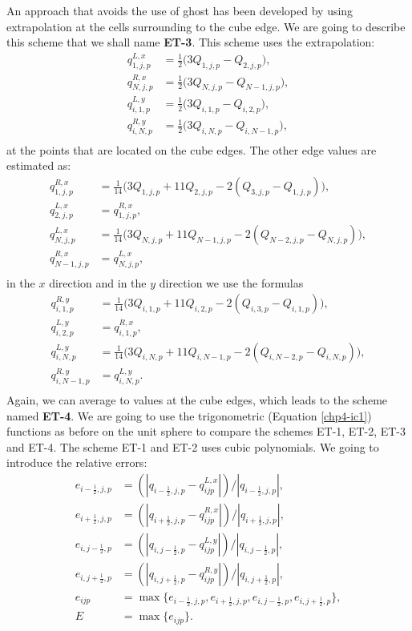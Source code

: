 An approach that avoids the use of ghost has been developed by \citet{putman:2007} using 
extrapolation at the cells surrounding to the cube edge.
We are going to describe this scheme that we shall name \textbf{ET-3}. This scheme uses the extrapolation:
\begin{align*}
	q^{L,x}_{1,j,p} &= \frac{1}{2}\bigg(3Q_{1,j,p} - Q_{2,j,p}\bigg),\\
	q^{R,x}_{N,j,p} &= \frac{1}{2}\bigg(3Q_{N,j,p} - Q_{N-1,j,p}\bigg),\\
	q^{L,y}_{i,1,p} &= \frac{1}{2}\bigg(3Q_{i,1,p} - Q_{i,2,p}\bigg),\\
	q^{R,y}_{i,N,p} &= \frac{1}{2}\bigg(3Q_{i,N,p} - Q_{i,N-1,p}\bigg),\\
\end{align*}
at the points that are located on the cube edges. The other edge values are estimated as:
\begin{align*}
	q^{R,x}_{1,j,p} &= \frac{1}{14}\bigg(3Q_{1,j,p} + 11Q_{2,j,p} - 2(Q_{3,j,p} - Q_{1,j,p})\bigg),\\
	q^{L,x}_{2,j,p} &= q^{R,x}_{1,j,p},\\
	q^{L,x}_{N,j,p} &= \frac{1}{14}\bigg(3Q_{N,j,p} + 11Q_{N-1,j,p} - 2(Q_{N-2,j,p} - Q_{N,j,p})\bigg),\\
	q^{R,x}_{N-1,j,p} &= q^{L,x}_{N,j,p},\\
\end{align*}
in the $x$ direction and in the $y$ direction we use the formulas
\begin{align*}
	q^{R,y}_{i,1,p} &= \frac{1}{14}\bigg(3Q_{i,1,p} + 11Q_{i,2,p} - 2(Q_{i,3,p} - Q_{i,1,p})\bigg),\\
	q^{L,y}_{i,2,p} &= q^{R,x}_{i,1,p},\\
	q^{L,y}_{i,N,p} &= \frac{1}{14}\bigg(3Q_{i,N,p} + 11Q_{i,N-1,p} - 2(Q_{i,N-2,p} - Q_{i,N,p})\bigg),\\
	q^{R,y}_{i,N-1,p} &= q^{L,y}_{i,N,p}.\\
\end{align*}
Again, we can average to values at the cube edges, which leads to the scheme named \textbf{ET-4}.
We are going to use the trigonometric (Equation \eqref{chp4-ic1}) functions
as before on the unit sphere to compare the schemes ET-1, ET-2, ET-3 and ET-4. The scheme ET-1 and ET-2
uses cubic polynomials.
We going to introduce the relative errors:
\begin{align*}
	e_{{i-\frac{1}{2}},j,p} &= (|q_{{i-\frac{1}{2}},j,p} - q^{L,x}_{ijp}|)/|q_{{i-\frac{1}{2}},j,p}|,\\
	e_{{i+\frac{1}{2}},j,p} &= (|q_{{i+\frac{1}{2}},j,p} - q^{R,x}_{ijp}|)/|q_{{i+\frac{1}{2}},j,p}|,\\
	e_{i,{j-\frac{1}{2}},p} &= (|q_{i,{j-\frac{1}{2}},p} - q^{L,y}_{ijp}|)/|q_{i,{j-\frac{1}{2}},p}|,\\
	e_{i,{j+\frac{1}{2}},p} &= (|q_{i,{j+\frac{1}{2}},p} - q^{R,y}_{ijp}|)/|q_{i,{j+\frac{1}{2}},p}|,\\
	e_{ijp} &= \max\{e_{{i-\frac{1}{2}},j,p}, e_{{i+\frac{1}{2}},j,p} , e_{i,{j-\frac{1}{2}},p}, e_{i,{j+\frac{1}{2}},p} \},\\
	E &= \max \{e_{ijp}\}.
\end{align*}
